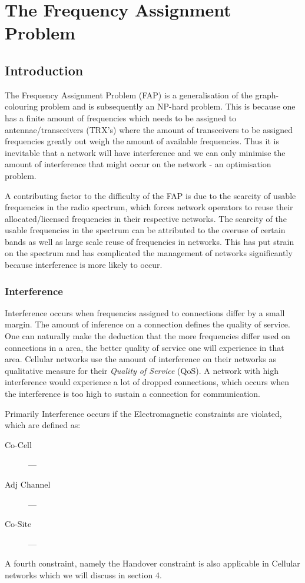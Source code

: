 \chapter{The Frequency Assignment Problem}
\section{Introduction}
The Frequency Assignment Problem (FAP) is a generalisation of the graph-colouring problem and is subsequently an NP-hard problem. This is because one has a finite amount of frequencies which needs to be 
assigned to antennae/transceivers (TRX's)  where the amount of transceivers to be assigned frequencies greatly out weigh the amount of available frequencies. Thus it is inevitable that a network will 
have interference and we can only minimise the amount of interference that might occur on the network - an optimisation problem. 

A contributing factor to the difficulty of the FAP is due to the scarcity of usable frequencies in the radio spectrum, which forces network operators to reuse their allocated/licensed frequencies in their respective networks. The scarcity of the usable frequencies in the spectrum can be attributed to the overuse of certain bands as well as large scale reuse of frequencies in networks. This has put strain on the spectrum and has complicated the management of networks significantly because interference is more likely to occur.

\subsection{Interference}
Interference occurs when frequencies assigned to connections differ by a small margin. The amount of inference on a connection defines the quality of service. One can naturally make the deduction that 
the more frequencies differ used on connections in a area, the better quality of service one will experience in that area. Cellular networks use the amount of interference on their networks as 
qualitative measure for their \emph{Quality of Service} (QoS). A network with high interference would experience a lot of dropped connections, which occurs when the interference is too high to sustain a connection for communication.

Primarily Interference occurs if the Electromagnetic constraints are violated, which are defined as:
\begin{description}
\item[Co-Cell] ---
\item[Adj Channel] ---
\item[Co-Site] ---
\end{description}
A fourth constraint, namely the Handover constraint is also applicable in Cellular networks which we will discuss in section 4.

